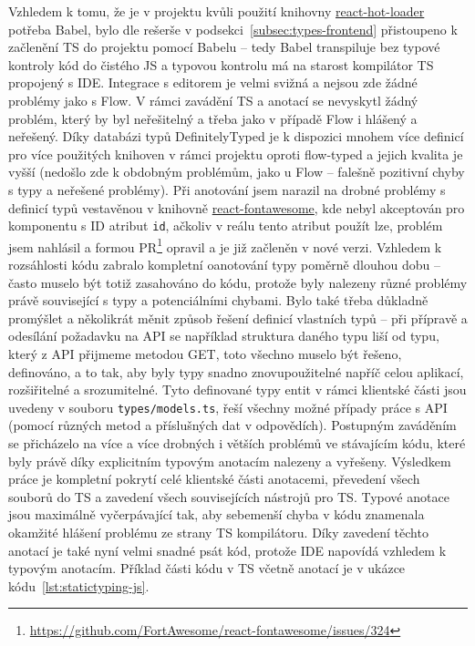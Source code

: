 Vzhledem k tomu, že je v projektu kvůli použití knihovny \href{https://github.com/gaearon/react-hot-loader}{react-hot-loader} potřeba Babel, bylo dle rešerše v podsekci~\ref{subsec:types-frontend} přistoupeno k začlenění TS do projektu pomocí Babelu -- tedy Babel transpiluje bez typové kontroly kód do čistého JS a typovou kontrolu má na starost kompilátor TS propojený s IDE. Integrace s editorem je velmi svižná a nejsou zde žádné problémy jako s Flow. V rámci zavádění TS a anotací se nevyskytl žádný problém, který by byl neřešitelný a třeba jako v případě Flow i hlášený a neřešený. Díky databázi typů DefinitelyTyped je k dispozici mnohem více definicí pro více použitých knihoven v rámci projektu oproti flow-typed a jejich kvalita je vyšší (nedošlo zde k obdobným problémům, jako u Flow -- falešně pozitivní chyby s typy a neřešené problémy). Při anotování jsem narazil na drobné problémy s definicí typů vestavěnou v knihovně \href{https://github.com/FortAwesome/react-fontawesome}{react-fontawesome}, kde nebyl akceptován pro komponentu s ID atribut \verb|id|, ačkoliv v reálu tento atribut použít lze, problém jsem nahlásil a formou PR\footnote{\url{https://github.com/FortAwesome/react-fontawesome/issues/324}} opravil a je již začleněn v nové verzi. Vzhledem k rozsáhlosti kódu zabralo kompletní oanotování typy poměrně dlouhou dobu -- často muselo být totiž zasahováno do kódu, protože byly nalezeny různé problémy právě související s typy a potenciálními chybami. Bylo také třeba důkladně promýšlet a několikrát měnit způsob řešení definicí vlastních typů -- při přípravě a odesílání požadavku na API se například struktura daného typu liší od typu, který z API přijmeme metodou GET, toto všechno muselo být řešeno, definováno, a to tak, aby byly typy snadno znovupoužitelné napříč celou aplikací, rozšiřitelné a srozumitelné. Tyto definované typy entit v rámci klientské části jsou uvedeny v souboru \verb|types/models.ts|, řeší všechny možné případy práce s API (pomocí různých metod a příslušných dat v odpovědích). Postupným zaváděním se přicházelo na více a více drobných i větších problémů ve stávajícím kódu, které byly právě díky explicitním typovým anotacím nalezeny a vyřešeny. Výsledkem práce je kompletní pokrytí celé klientské části anotacemi, převedení všech souborů do TS a zavedení všech souvisejících nástrojů pro TS. Typové anotace jsou maximálně vyčerpávající tak, aby sebemenší chyba v kódu znamenala okamžité hlášení problému ze strany TS kompilátoru. Díky zavedení těchto anotací je také nyní velmi snadné psát kód, protože IDE napovídá vzhledem k typovým anotacím. Příklad části kódu v TS včetně anotací je v ukázce kódu~\ref{lst:statictyping-js}.

